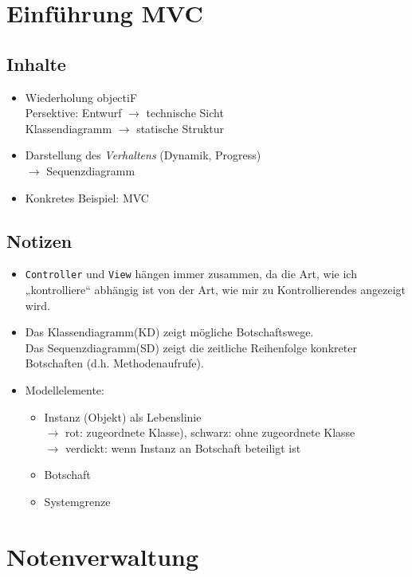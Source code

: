 \chapter{Einführung MVC}
\section*{Inhalte}
\begin{itemize}
\item Wiederholung objectiF\\
Persektive: Entwurf $\to$ technische Sicht\\
Klassendiagramm $\to$ statische Struktur
\item Darstellung des \emph{Verhaltens} (Dynamik, Progress)\\
$\to$ Sequenzdiagramm
\item Konkretes Beispiel: MVC
\end{itemize}
\section*{Notizen}
\begin{itemize}
\item \lstinline$Controller$ und \lstinline$View$ hängen immer zusammen, da die Art, wie ich „kontrolliere“ abhängig ist von der Art, wie mir zu Kontrollierendes angezeigt wird.
\item Das Klassendiagramm(KD) zeigt mögliche Botschaftswege.\\
Das Sequenzdiagramm(SD) zeigt die zeitliche Reihenfolge konkreter Botschaften (d.h. Methodenaufrufe).
\item Modellelemente:
\begin{itemize}
\item Instanz (Objekt) als Lebenslinie\\
$\to$ rot: zugeordnete Klasse), schwarz: ohne zugeordnete Klasse\\
$\to$ verdickt: wenn Instanz an Botschaft beteiligt ist
\item Botschaft
\item Systemgrenze
\end{itemize}
\end{itemize}

\chapter{Notenverwaltung}

